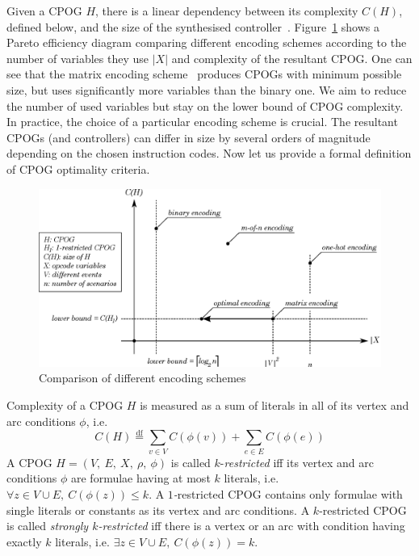 Given a CPOG $H$, there is a linear dependency between its complexity
$C(H)$, defined below, and the size of the synthesised controller~\cite{2010_mokhov_ieee}.
Figure~\ref{fig-Size-of-specification} shows a Pareto efficiency diagram comparing
different encoding schemes according to the number of variables they
use $|X|$ and complexity of the resultant CPOG. One can see that
the matrix encoding scheme~\cite{2009_mokhov_phd} produces CPOGs
with minimum possible size, but uses significantly more variables
than the binary one. We aim to reduce the number of used variables
but stay on the lower bound of CPOG complexity. In practice, the choice
of a particular encoding scheme is crucial. The resultant CPOGs (and
controllers) can differ in size by several orders of magnitude depending
on the chosen instruction codes. Now let us provide a formal definition
of CPOG optimality criteria.

\begin{figure}[h]
\begin{centering}
\includegraphics[width=0.75\columnwidth]{fig/encodings}

\par\end{centering}

\caption{Comparison of different encoding schemes\label{fig-Size-of-specification}}
\end{figure}

Complexity
of a CPOG $H$ is measured as a sum of literals in all of its vertex
and arc conditions $\phi$, i.e.
\[
C(H)\overset{\textrm{df}}{=}\sum_{v\in V}C(\phi(v))+\sum_{e\in E}C(\phi(e))
\]
A CPOG $H=(V,\ E,\ X,\ \rho,\ \phi)$ is called $k$-\emph{restricted}
iff its vertex and arc conditions $\phi$ are formulae having at most
$k$ literals, i.e. $\forall z\in V\cup E,\ C(\phi(z))\le k$. A \emph{$1$-}restricted
CPOG contains only formulae with single literals or constants as its
vertex and arc conditions. A $k$-restricted CPOG is called \emph{strongly $k$-restricted} 
iff there is a vertex or an arc with condition
having exactly $k$ literals, i.e. $\exists z\in V\cup E,\ C(\phi(z))=k$.

